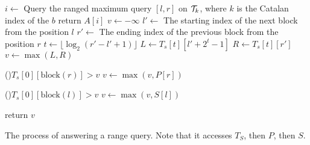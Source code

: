 \begin{algorithm}
\SetAlgoNoLine
{}

 {
  $i \gets$ Query the ranged maximum query $[l, r]$ on ${\cal T}_{k}$, where $k$ is the Catalan index of the $b$  \;
  return $A[i]$ \;
}
$v \gets - \infty$ \;
$l' \gets$ The starting index of the next block from the position $l$ \;
$r' \gets$ The ending index of the previous block from the position $r$ \;
 {
  $t \gets \lfloor \log_2 (r'-l'+1) \rfloor$ \;
  $L \gets T_s[t][l' + 2^t - 1]$ \;
  $R \gets T_s[t][r']$ \;
  $v \gets \max(L, R)$ \;
}

\If(){$T_s[0][\text{block}(r)] > v$} {
  $v \gets \max(v, P[r])$ \;
}

\If(){$T_s[0][\text{block}(l)] > v$} {
  $v \gets \max(v, S[l])$ \;
}

return $v$ \;

\caption{The process of answering a range query. Note that it accesses
  $T_S$, then $P$, then $S$.}
\label{alg:rmq-access-order-2e}
\end{algorithm}

